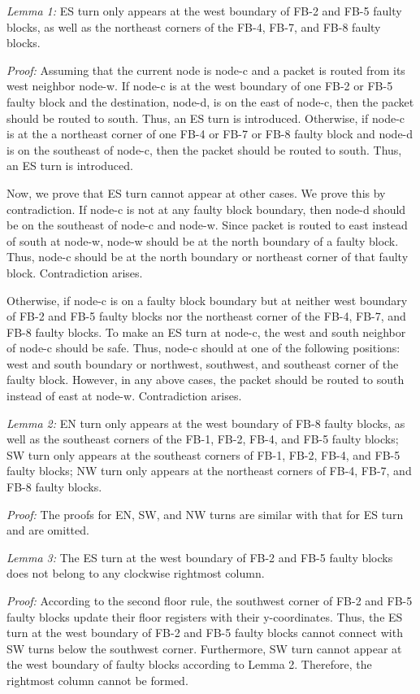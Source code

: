 \textit{Lemma 1:} ES turn only appears at the west boundary of FB-2 and FB-5 faulty blocks, as well as the northeast corners of the FB-4, FB-7, and FB-8 faulty blocks.

\textit{Proof:} Assuming that the current node is node-c and a packet is routed from its west neighbor node-w. If node-c is at the west boundary of one FB-2 or FB-5 faulty block and the destination, node-d, is on the east of node-c, then the packet should be routed to south. Thus, an ES turn is introduced. Otherwise, if node-c is at the a northeast corner of one FB-4 or FB-7 or FB-8 faulty block and node-d is on the southeast of node-c, then the packet should be routed to south. Thus, an ES turn is introduced.

Now, we prove that ES turn cannot appear at other cases. We prove this by contradiction. If node-c is not at any faulty block boundary, then node-d should be on the southeast of node-c and node-w. Since packet is routed to east instead of south at node-w, node-w should be at the north boundary of a faulty block. Thus, node-c should be at the north boundary or northeast corner of that faulty block. Contradiction arises.

Otherwise, if node-c is on a faulty block boundary but at neither west boundary of FB-2 and FB-5 faulty blocks nor the northeast corner of the FB-4, FB-7, and FB-8 faulty blocks. To make an ES turn at node-c, the west and south neighbor of node-c should be safe. Thus, node-c should at one of the following positions: west and south boundary or northwest, southwest, and southeast corner of the faulty block. However, in any above cases, the packet should be routed to south instead of east at node-w. Contradiction arises.

\textit{Lemma 2:} EN turn only appears at the west boundary of FB-8 faulty blocks, as well as the southeast corners of the FB-1, FB-2, FB-4, and FB-5 faulty blocks; SW turn only appears at the southeast corners of FB-1, FB-2, FB-4, and FB-5 faulty blocks; NW turn only appears at the northeast corners of FB-4, FB-7, and FB-8 faulty blocks.

\textit{Proof:} The proofs for EN, SW, and NW turns are similar with that for ES turn and are omitted. 

\textit{Lemma 3:} The ES turn at the west boundary of FB-2 and FB-5 faulty blocks does not belong to any clockwise rightmost column.

\textit{Proof:} According to the second floor rule, the southwest corner of FB-2 and FB-5 faulty blocks update their floor registers with their y-coordinates. Thus, the ES turn at the west boundary of FB-2 and FB-5 faulty blocks cannot connect with SW turns below the southwest corner. Furthermore, SW turn cannot appear at the west boundary of faulty blocks according to Lemma 2. Therefore, the rightmost column cannot be formed.

